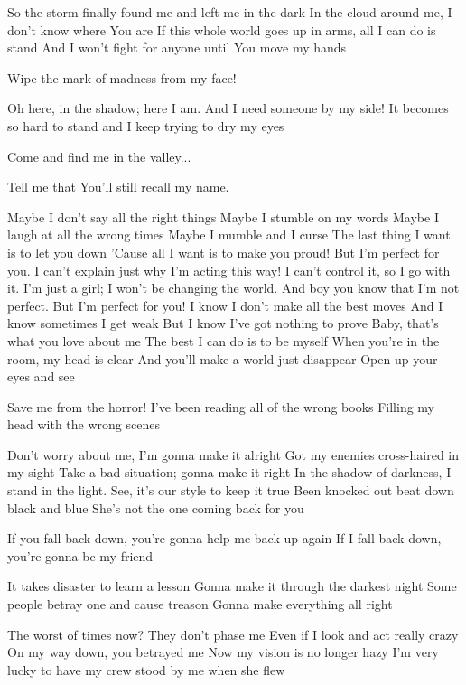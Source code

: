 So the storm finally found me and left me in the dark
In the cloud around me, I don’t know where You are
If this whole world goes up in arms, all I can do is stand
And I won’t fight for anyone until You move my hands

Wipe the mark of madness from my face!

Oh here, in the shadow; here I am.
And I need someone by my side!
It becomes so hard to stand and I keep trying to dry my eyes

Come and find me in the valley...

Tell me that You'll still recall my name.


Maybe I don't say all the right things
Maybe I stumble on my words
Maybe I laugh at all the wrong times
Maybe I mumble and I curse
The last thing I want is to let you down
'Cause all I want is to make you proud!
But I'm perfect for you.
I can't explain just why I'm acting this way!
I can't control it, so I go with it.
I'm just a girl; I won't be changing the world.
And boy you know that I'm not perfect.
But I'm perfect for you!
I know I don't make all the best moves
And I know sometimes I get weak
But I know I've got nothing to prove
Baby, that's what you love about me
The best I can do is to be myself
When you're in the room, my head is clear
And you'll make a world just disappear
Open up your eyes and see


Save me from the horror!
I've been reading all of the wrong books
Filling my head with the wrong scenes

Don't worry about me, I'm gonna make it alright
Got my enemies cross-haired in my sight
Take a bad situation; gonna make it right
In the shadow of darkness, I stand in the light.
See, it's our style to keep it true
Been knocked out beat down black and blue
She's not the one coming back for you

If you fall back down, you're gonna help me back up again
If I fall back down, you're gonna be my friend

It takes disaster to learn a lesson
Gonna make it through the darkest night
Some people betray one and cause treason
Gonna make everything all right

The worst of times now? They don't phase me
Even if I look and act really crazy
On my way down, you betrayed me
Now my vision is no longer hazy
I'm very lucky to have my crew stood by me when she flew

